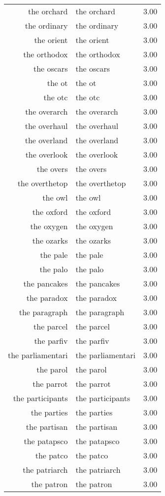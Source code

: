 \begin{table}[ht]
\begin{tabular}{rlr}
  the orchard & the orchard & 3.00 \\ 
  the ordinary & the ordinary & 3.00 \\ 
  the orient & the orient & 3.00 \\ 
  the orthodox & the orthodox & 3.00 \\ 
  the oscars & the oscars & 3.00 \\ 
  the ot & the ot & 3.00 \\ 
  the otc & the otc & 3.00 \\ 
  the overarch & the overarch & 3.00 \\ 
  the overhaul & the overhaul & 3.00 \\ 
  the overland & the overland & 3.00 \\ 
  the overlook & the overlook & 3.00 \\ 
  the overs & the overs & 3.00 \\ 
  the overthetop & the overthetop & 3.00 \\ 
  the owl & the owl & 3.00 \\ 
  the oxford & the oxford & 3.00 \\ 
  the oxygen & the oxygen & 3.00 \\ 
  the ozarks & the ozarks & 3.00 \\ 
  the pale & the pale & 3.00 \\ 
  the palo & the palo & 3.00 \\ 
  the pancakes & the pancakes & 3.00 \\ 
  the paradox & the paradox & 3.00 \\ 
  the paragraph & the paragraph & 3.00 \\ 
  the parcel & the parcel & 3.00 \\ 
  the parfiv & the parfiv & 3.00 \\ 
  the parliamentari & the parliamentari & 3.00 \\ 
  the parol & the parol & 3.00 \\ 
  the parrot & the parrot & 3.00 \\ 
  the participants & the participants & 3.00 \\ 
  the parties & the parties & 3.00 \\ 
  the partisan & the partisan & 3.00 \\ 
  the patapsco & the patapsco & 3.00 \\ 
  the patco & the patco & 3.00 \\ 
  the patriarch & the patriarch & 3.00 \\ 
  the patron & the patron & 3.00 \\ 

\end{tabular}
\end{table}
